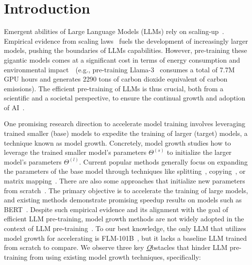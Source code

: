 \documentclass{article}
\begin{document}
\section{Introduction}\label{sec:intro}

Emergent abilities of Large Language Models (LLMs) rely on scaling-up~\citep{brown2020language, wei2022emergent}. 
Empirical evidence from scaling laws~\citep{kaplan2020scaling, hoffmann2022training, alabdulmohsin2022revisiting} fuels the development of increasingly larger models, pushing the boundaries of LLMs capabilities.
However, pre-training these gigantic models comes at a significant cost in terms of energy consumption and environmental impact~\cite{xu2024survey}~(e.g., pre-training Llama-3~\cite{llama3modelcard} consumes a total of 7.7M GPU hours and generates 2290 tons of carbon dioxide equivalent of carbon emissions).
The efficient pre-training of LLMs is thus crucial, both from a scientific and a societal perspective, to ensure the continual growth and adoption of AI~\cite{wu2022sustainable, DEVRIES20232191}.

One promising research direction to accelerate model training involves leveraging trained smaller (base) models to expedite the training of larger (target) models, a technique known as model growth. 
Concretely, model growth studies how to leverage the trained smaller model's parameters $\Theta^{(s)}$ to initialize the larger model's parameters $\Theta^{(l)}$. 
Current popular methods generally focus on expanding the parameters of the base model through techniques like splitting~\cite{chen2015net2net,chen2021bert2bert,wang2023lemon}, copying~\cite{shen2022staged,gong2019efficient}, or matrix mapping~\cite{wang2023learning}. There are also some approaches that initialize new parameters from scratch~\cite{evci2022gradmax,wang2023lemon,yao2024masked}. 
The primary objective is to accelerate the training of large models, and existing methods demonstrate promising speedup results on models such as BERT~\cite{chen2021bert2bert, gong2019efficient, yang2020progressively, wang2023learning, wang2023lemon, shen2022staged}. 
Despite such empirical evidence and its alignment with the goal of efficient LLM pre-training, model growth methods are not widely adopted in the context of LLM pre-training~\cite{llama3modelcard, jiang2023mistral}. To our best knowledge, the only LLM that utilizes model growth for accelerating is FLM-101B~\cite{li2023flm101b}, but it lacks a baseline LLM trained from scratch to compare.
We observe three key \underline{\textit{O}}bstacles that hinder LLM pre-training from using existing model growth techniques, specifically:
\end{document}
